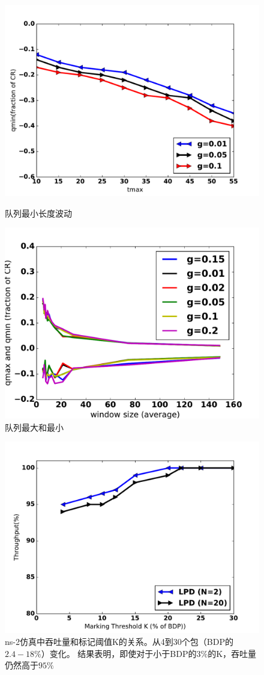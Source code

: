 \begin{figure}
\begin{minipage}{0.5\textwidth}
  \centering
  \includegraphics[width=0.7\columnwidth]{figures/LPD/model/qmin.pdf}
  \caption{队列最小长度波动}
  \label{qmin-fig}
\end{minipage}
\begin{minipage}{0.5\textwidth}
  \centering
  \includegraphics[width=0.7\columnwidth]{figures/LPD/model/k.pdf}
  \caption{队列最大和最小}
  \label{k-fig}
\end{minipage}
\end{figure}

\begin{figure}[H] 
  \centering
  \includegraphics[width=0.6\columnwidth]{figures/LPD/model/throughput.pdf}
  \caption{ns-2仿真中吞吐量和标记阈值K的关系。从4到30个包（BDP的$2.4-18\%$）变化。 
结果表明，即使对于小于BDP的$3\%$的K，吞吐量仍然高于$95\%$}
  \label{throughput-fig}
\end{figure}


